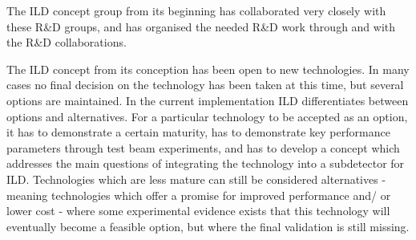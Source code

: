 \documentclass[%
 amsmath,amssymb,
 aps,
]{revtex4-1}
\begin{document}
The ILD concept group from its beginning has collaborated very closely with these R\&D groups, and has organised the needed R\&D work through and with the R\&D collaborations. 

The ILD concept from its conception has been open to new technologies. 
In many cases no final decision on the technology has been taken at this time, but several options are maintained. In the current implementation ILD differentiates between options and alternatives. 
For a particular technology to be accepted as an option, it has to demonstrate a certain maturity, has to demonstrate key performance parameters through test beam experiments, and has to develop a concept which addresses the main questions of integrating the technology into a subdetector for ILD. Technologies which are less mature can still be considered alternatives - meaning technologies which offer a promise for improved performance and/ or lower cost - where some experimental evidence exists that this technology will eventually become a feasible option, but where the final validation is still missing. 
\end{document}
